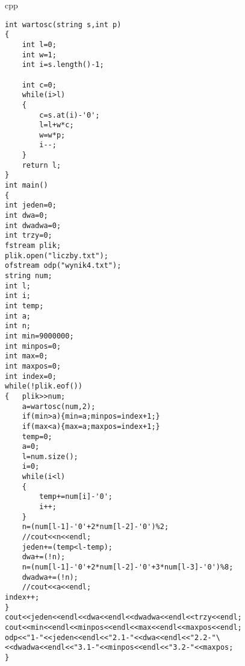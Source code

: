 \documentclass{article}
\begin{document}
\begin{temp}{\large cpp}  
\begin{lstlisting}
int wartosc(string s,int p)
{
	int l=0;
	int w=1;
	int i=s.length()-1;
	
	int c=0;
	while(i>l)
    {
    	c=s.at(i)-'0';
    	l=l+w*c;
    	w=w*p;
        i--;
    }
	return l;
}
int main()
{
int jeden=0;
int dwa=0;
int dwadwa=0;
int trzy=0;
fstream plik;
plik.open("liczby.txt");
ofstream odp("wynik4.txt");
string num;
int l;
int i;
int temp;
int a;
int n;
int min=9000000;
int minpos=0;
int max=0;
int maxpos=0;
int index=0;
while(!plik.eof())
{	plik>>num;
	a=wartosc(num,2);
	if(min>a){min=a;minpos=index+1;}
	if(max<a){max=a;maxpos=index+1;}
	temp=0;
	a=0;
	l=num.size();
	i=0;
	while(i<l)
	{
		temp+=num[i]-'0';
		i++;	
	}
	n=(num[l-1]-'0'+2*num[l-2]-'0')%2;
	//cout<<n<<endl;
	jeden+=(temp<l-temp);
	dwa+=(!n);
	n=(num[l-1]-'0'+2*num[l-2]-'0'+3*num[l-3]-'0')%8;
	dwadwa+=(!n);
	//cout<<a<<endl;
index++;
}
cout<<jeden<<endl<<dwa<<endl<<dwadwa<<endl<<trzy<<endl;
cout<<min<<endl<<minpos<<endl<<max<<endl<<maxpos<<endl;
odp<<"1-"<<jeden<<endl<<"2.1-"<<dwa<<endl<<"2.2-"\
<<dwadwa<<endl<<"3.1-"<<minpos<<endl<<"3.2-"<<maxpos;
}

\end{lstlisting}
\end{temp}
\end{document}
